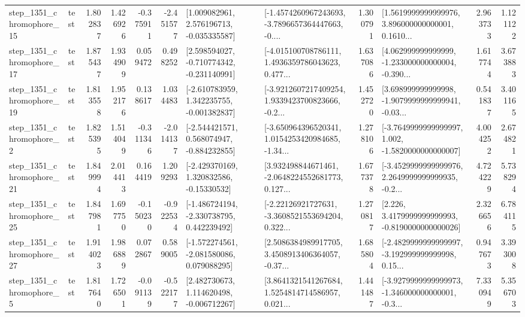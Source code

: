 \begin{tabular}{llrrrrllrlrr}
 step\_1351\_chromophore\_15 &      test &      1.802837 &    1.426926 &     -0.375911 & -2.451577 &    [1.009082961, 2.576196713, -0.035335587] &  [-1.4574260967243693, -3.7896657364447663, -0.... &       1.300791 &  [1.5619999999999976, 3.896000000000001, 0.1610... &            2.963733 &          1.121122 \\
 step\_1351\_chromophore\_17 &      test &      1.875437 &    1.934909 &      0.059472 &  0.498252 &   [2.598594027, -0.710774342, -0.231140991] &  [-4.015100708786111, 1.4936359786043623, 0.477... &       1.637086 &  [4.062999999999999, -1.233000000000004, -0.390... &            1.617744 &          3.673883 \\
 step\_1351\_chromophore\_19 &      test &      1.813558 &    1.952176 &      0.138617 &  1.034483 &   [-2.610783959, 1.342235755, -0.001382837] &  [-3.9212607217409254, 1.9339423700823666, -0.2... &       1.452720 &  [3.698999999999998, -1.9079999999999941, -0.03... &            0.541837 &          3.401165 \\
  step\_1351\_chromophore\_2 &      test &      1.825395 &    1.514049 &     -0.311346 & -2.014137 &   [-2.544421571, 0.568074947, -0.884232855] &  [-3.650964396520341, 1.0154253420984685, -1.34... &       1.278106 &  [-3.7649999999999997, 1.002, -1.5820000000000007] &            4.004252 &          2.674821 \\
 step\_1351\_chromophore\_21 &      test &      1.849994 &    2.014413 &      0.164419 &  1.209293 &    [-2.429370169, 1.320832586, -0.15330532] &  [3.932498844671461, -2.0648224552681773, 0.127... &       1.677378 &  [-3.4529999999999976, 2.2649999999999935, -0.2... &            4.724229 &          5.738294 \\
 step\_1351\_chromophore\_25 &      test &      1.847981 &    1.697750 &     -0.150230 & -0.922534 &   [-1.486724194, -2.330738795, 0.442239492] &  [-2.22126921727631, -3.3608521553694204, 0.322... &       1.270817 &   [2.226, 3.4179999999999993, -0.8190000000000026] &            2.326656 &          6.784115 \\
 step\_1351\_chromophore\_27 &      test &      1.914023 &    1.986889 &      0.072867 &  0.589005 &   [-1.572274561, -2.081580086, 0.079088295] &  [2.5086384989917705, 3.4508913406364057, -0.37... &       1.685804 &  [-2.4829999999999997, -3.192999999999998, 0.15... &            0.947673 &          3.393008 \\
  step\_1351\_chromophore\_5 &      test &      1.817640 &    1.726501 &     -0.091139 & -0.522177 &    [2.482730673, 1.114620498, -0.006712267] &  [3.8641321541267684, 1.5254814714586957, 0.021... &       1.441487 &  [-3.9279999999999973, -1.346000000000001, -0.3... &            7.330949 &          5.356703 \\

\end{tabular}
